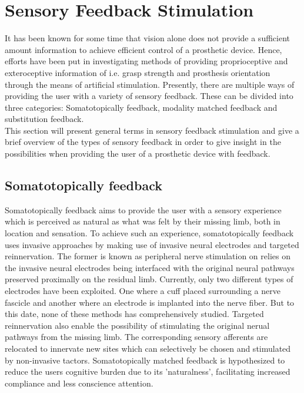 \section{Sensory Feedback Stimulation}

It has been known for some time that vision alone does not provide a sufficient amount information to achieve efficient control of a prosthetic device. Hence, efforts have been put in investigating methods of providing proprioceptive and exteroceptive information of i.e. grasp strength and prosthesis orientation through the means of artificial stimulation. \cite{Stephens-Fripp2018,Schofield2014} Presently, there are multiple ways of providing the user with a variety of sensory feedback. These can be divided into three categories: Somatotopically feedback, modality matched feedback and substitution feedback. \cite{Schofield2014} \\
This section will present general terms in sensory feedback stimulation and give a brief overview of the types of sensory feedback in order to give insight in the possibilities when providing the user of a prosthetic device with feedback.

\subsection{Somatotopically feedback}

Somatotopically feedback aims to provide the user with a sensory experience which is perceived as natural as what was felt by their missing limb, both in location and sensation. To achieve such an experience, somatotopically feedback uses invasive approaches by making use of invasive neural electrodes and targeted reinnervation. The former is known as peripheral nerve stimulation on relies on the invasive neural electrodes being interfaced with the original neural pathways preserved proximally on the residual limb. Currently, only two different types of electrodes have been exploited. One where a cuff placed surrounding a nerve fascicle and another where an electrode is implanted into the nerve fiber. But to this date, none of these methods has comprehensively studied. Targeted reinnervation also enable the possibility of stimulating the original nerual pathways from the missing limb. The corresponding sensory afferents are relocated to innervate new sites which can selectively be chosen and stimulated by non-invasive tactors. Somatotopically matched feedback is hypothesized to reduce the users cognitive burden due to its 'naturalness', facilitating increased compliance and less conscience attention. \cite{Schofield2014}  

